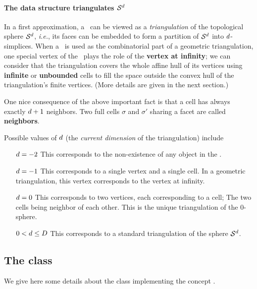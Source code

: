 \paragraph{The data structure triangulates $\mathcal S^{d}$}

In a first approximation, a \tds\ can be viewed as
a \emph{triangulation} of the topological sphere $\mathcal S^{d}$,
\emph{i.e.}, its faces can be embedded to form a partition of $\mathcal S^{d}$ into $d$-simplices. When a
\tds\ is used as the combinatorial part of a geometric triangulation, one
special vertex of the \tds\ plays the role of the \textbf{vertex at
infinity}; we can consider that the triangulation covers the whole
affine hull of its vertices
using \textbf{infinite} or \textbf{unbounded} cells to fill the space  outside the convex
hull of the triangulation's finite vertices. (More details are given in the next section.)


One nice consequence of the above important fact is that a cell has
always exactly  $d+1$ neighbors.
Two  full cells $\sigma$ and $\sigma'$ sharing a facet are called
\textbf{neighbors}.


Possible values of $d$ (the \emph{current dimension} of the triangulation) include
\begin{itemize}
\item[$d=-2$] This corresponds to the non-existence of any object in
  the \tds.
\item[$d=-1$] This corresponds to a single vertex and a single cell. In a
geometric triangulation, this vertex corresponds to the vertex at infinity.
\item[$d=0$] This corresponds to two vertices, each corresponding to
  a cell;
The two cells being neighbor of each other. This is the unique
triangulation of the $0$-sphere.
\item[$0<d\le D$] This corresponds to a standard triangulation of
the sphere $\mathcal S^{d}$.
\end{itemize}


\subsection{The class \label{triangulation:tds:impl}}

We give here some details about the class
implementing the concept .



